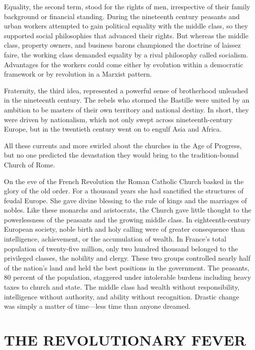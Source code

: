 Equality, the second term, stood for the rights of men, irrespective of their family background or
financial standing. During the nineteenth century peasants and urban workers attempted to gain
political equality with the middle class, so they supported social philosophies that advanced their
rights. But whereas the middle class, property owners, and business barons championed the doctrine
of laissez faire, the working class demanded equality by a rival philosophy called socialism.
Advantages for the workers could come either by evolution within a democratic framework or by
revolution in a Marxist pattern.

Fraternity, the third idea, represented a powerful sense of brotherhood unleashed in the nineteenth
century. The rebels who stormed the Bastille were united by an ambition to be masters of their own
territory and national destiny. In short, they were driven by nationalism, which not only swept
across nineteenth-century Europe, but in the twentieth century went on to engulf Asia and Africa.

All these currents and more swirled about the churches in the Age of Progress, but no one predicted
the devastation they would bring to the tradition-bound Church of Rome.

On the eve of the French Revolution the Roman Catholic Church basked in the glory of the old order.
For a thousand years she had sanctified the structures of feudal Europe. She gave divine blessing to
the rule of kings and the marriages of nobles. Like these monarchs and aristocrats, the Church gave
little thought to the powerlessness of the peasants and the growing middle class. In
eighteenth-century European society, noble birth and holy calling were of greater consequence than
intelligence, achievement, or the accumulation of wealth. In France’s total population of
twenty-five million, only two hundred thousand belonged to the privileged classes, the nobility and
clergy. These two groups controlled nearly half of the nation’s land and held the best positions in
the government. The peasants, 80 percent of the population, staggered under intolerable burdens
including heavy taxes to church and state. The middle class had wealth without responsibility,
intelligence without authority, and ability without recognition. Drastic change was simply a matter
of time—less time than anyone dreamed.

\section{THE REVOLUTIONARY FEVER}

